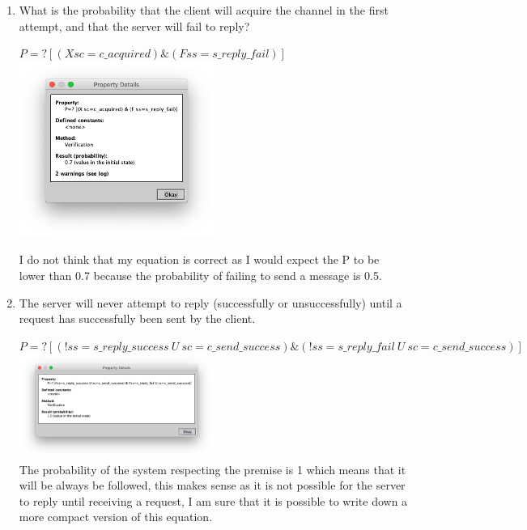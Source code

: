 \documentclass{article}
\begin{document}
\begin{enumerate}
\begin{enumerate}
\item What is the probability that the client will acquire the channel in the first attempt, and that the server will fail to reply? \\
  \begin{center}
     $P=? [(X sc=c\_acquired) \& (F ss=s\_reply\_fail)]$\\
    \includegraphics[width=0.5\textwidth]{hw14p31}\\
  \end{center}
  I do not think that my equation is correct as I would expect the P to be lower than 0.7 because the probability of failing to send a message is 0.5.\\
\item  The server will never attempt to reply (successfully or unsuccessfully) until a request has successfully been sent by the client.
   \begin{center}
     $P=? [(!ss=s\_reply\_success\: U\:sc=c\_send\_success) \& (!ss=s\_reply\_fail\: U\: sc=c\_send\_success)]$\\
     \includegraphics[width=0.5\textwidth]{hw14p32}\\
     The probability of the system respecting the premise is 1 which means that it will be always be followed, this makes sense as it is not possible for the server to reply until receiving a request, I am sure that it is possible to write down a more compact version of this equation.\\
  \end{center}
\end{enumerate}

\end{enumerate}
\end{document}
